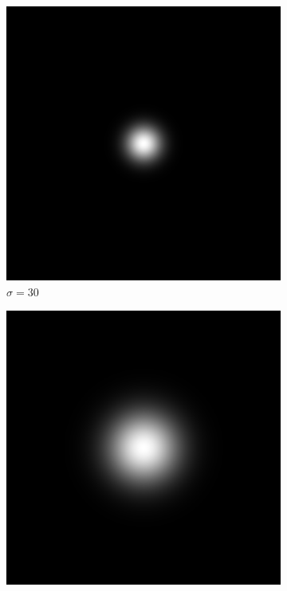 \documentclass[
	12pt, %
]{style/fphw}
\begin{document}
\begin{figure}[H]
    \centering
     \begin{subfigure}[b]{.3\textwidth}
         \centering
         \includegraphics[width=\textwidth]{plots2/Q5_2_lowpass_filter_30.png}
         \caption{$\sigma=30$}
         \label{Q5_2_lowpass_filter_30}
     \end{subfigure}
     \hfill
     \begin{subfigure}[b]{.3\textwidth}
         \centering
         \includegraphics[width=\textwidth]{plots2/Q5_2_lowpass_filter_60.png}

\end{subfigure}
\end{figure}
\end{document}
